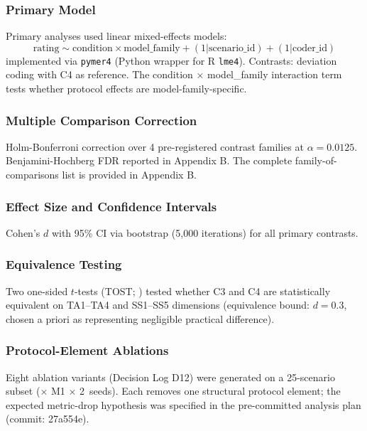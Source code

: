 \documentclass[12pt]{article}
\begin{document}
\subsubsection{Primary Model}

Primary analyses used linear mixed-effects models:
\begin{equation}
\text{rating} \sim \text{condition} \times \text{model\_family} + (1 | \text{scenario\_id}) + (1 | \text{coder\_id})
\end{equation}
implemented via \texttt{pymer4} (Python wrapper for R \texttt{lme4}).
Contrasts: deviation coding with C4 as reference.
The condition $\times$ model\_family interaction term tests whether protocol effects are
model-family-specific.

\subsubsection{Multiple Comparison Correction}

Holm-Bonferroni correction over 4 pre-registered contrast families at $\alpha = 0.0125$.
Benjamini-Hochberg FDR reported in Appendix B.
The complete family-of-comparisons list is provided in Appendix B.

\subsubsection{Effect Size and Confidence Intervals}

Cohen's $d$ with 95\% CI via bootstrap (5,000 iterations) for all primary contrasts.

\subsubsection{Equivalence Testing}

Two one-sided $t$-tests (TOST; \citealt{lakens2017}) tested whether C3 and C4 are
statistically equivalent on TA1--TA4 and SS1--SS5 dimensions (equivalence bound: $d = 0.3$,
chosen a priori as representing negligible practical difference).

\subsubsection{Protocol-Element Ablations}

Eight ablation variants (Decision Log D12) were generated on a 25-scenario subset
($\times$ M1 $\times$ 2~seeds). Each removes one structural protocol element; the expected
metric-drop hypothesis was specified in the pre-committed analysis plan (commit: 27a554e).
\end{document}
